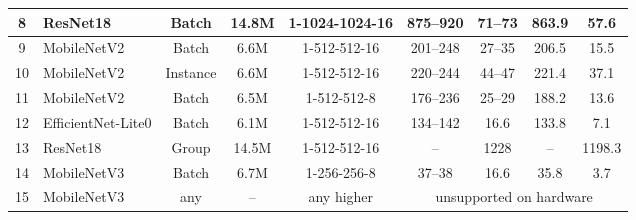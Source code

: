 \begin{table}[!htbp]
\begin{tabularx}{\textwidth}{c|>{\centering\arraybackslash}Xcc|c|cc|cc}
		\hline
		8 & ResNet18 %
		& Batch
		& 14.8M
		& 1-1024-1024-16
		& 875--920
		& 71--73
		& 863.9
		& 57.6 \\
		\hline
		9 & MobileNetV2 %
		& Batch
		& 6.6M
		& 1-512-512-16
		& 201--248
		& 27--35
		& 206.5
		& 15.5 \\
		\hline
		10 & MobileNetV2 %
		& Instance
		& 6.6M
		& 1-512-512-16
		& 220--244
		& 44--47
		& 221.4
		& 37.1 \\
		\hline
		11 & MobileNetV2
		& Batch
		& 6.5M
		& 1-512-512-8
		& 176--236
		& 25--29
		& 188.2
		& 13.6 \\
		\hline
		12 & EfficientNet-Lite0
		& Batch
		& 6.1M
		& 1-512-512-16
		& 134--142
		& 16.6 \underline{\smash{cap}}
		& 133.8
		& 7.1 \\
		\hline
		13 & ResNet18
		& Group
		& 14.5M
		& 1-512-512-16
		& --
		& 1228
		& --
		& 1198.3 \\
		\hline
		14 & MobileNetV3
		& Batch
		& 6.7M
		& 1-256-256-8 
		& 37--38
		& 16.6 \underline{\smash{cap}} 
		& 35.8
		& 3.7 \\
		\hline
		15 & MobileNetV3
		& any
		& --
		& any higher 
		& \multicolumn{4}{c}{unsupported on hardware}\\
		\hline
%
	\end{tabularx}	
	\centering

\end{table}
